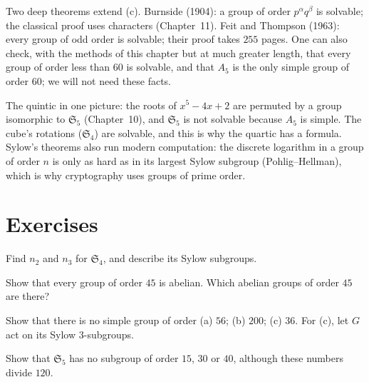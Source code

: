 \begin{remark}
Two deep theorems extend (c). Burnside (1904): a group of order $p^\alpha q^\beta$ is solvable; the classical proof uses characters (Chapter~11). Feit and Thompson (1963): every group of odd order is solvable; their proof takes $255$ pages. One can also check, with the methods of this chapter but at much greater length, that every group of order less than $60$ is solvable, and that $A_5$ is the only simple group of order $60$; we will not need these facts.
\end{remark}

\begin{beauty}
The quintic in one picture: the roots of $x^5-4x+2$ are permuted by a group isomorphic to $\mathfrak S_5$ (Chapter~10), and $\mathfrak S_5$ is not solvable because $A_5$ is simple. The cube's rotations ($\mathfrak S_4$) are solvable, and this is why the quartic has a formula. Sylow's theorems also run modern computation: the discrete logarithm in a group of order $n$ is only as hard as in its largest Sylow subgroup (Pohlig--Hellman), which is why cryptography uses groups of prime order.
\end{beauty}

\section{Exercises}

\begin{exercise}[$\star$]\label{ex:sylowS4}
Find $n_2$ and $n_3$ for $\mathfrak S_4$, and describe its Sylow subgroups.
\end{exercise}

\begin{exercise}[$\star$]\label{ex:order45}
Show that every group of order $45$ is abelian. Which abelian groups of order $45$ are there?
\end{exercise}

\begin{exercise}[$\star\star$]\label{ex:nosimple}
Show that there is no simple group of order (a) $56$; (b) $200$; (c) $36$. For (c), let $G$ act on its Sylow $3$-subgroups.
\end{exercise}

\begin{exercise}[$\star\star$]\label{ex:S5sub}
Show that $\mathfrak S_5$ has no subgroup of order $15$, $30$ or $40$, although these numbers divide $120$.
\end{exercise}


